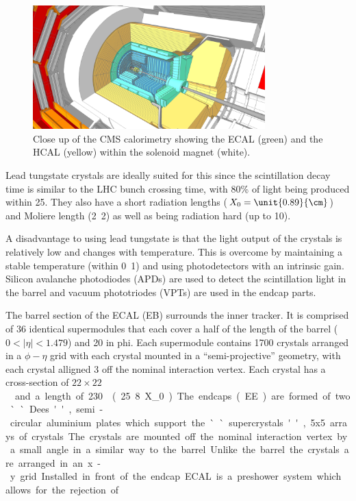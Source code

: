 \begin{figure}[htp]
  \centering
  \includegraphics[width=0.8\textwidth]{hcal.png}
  \caption{Close up of the CMS calorimetry showing the ECAL (green) and the HCAL
(yellow) within the solenoid magnet (white).}
  \label{fig:calo}
\end{figure}

Lead tungstate crystals are ideally suited for this since the scintillation
decay time is similar to the LHC bunch crossing time, 
with \unit{80}{\%} of light being produced within \unit{25}{\ns}.
They also have a short radiation lengths ($X_0=\unit{0.89}{\cm}$) 
and Moliere length (\unit{2.2}{\cm}) as well as being radiation hard
(up to \unit{10}{\mrad}).

A disadvantage to using lead tungstate is that the light output of the crystals
is relatively low and changes with temperature. This is overcome by maintaining
a stable temperature (within \unit{0.1}{\degreecelsius}) and using
photodetectors with an intrinsic gain.
Silicon avalanche photodiodes (APDs) are used to detect the scintillation light
in the barrel and vacuum phototriodes (VPTs) are used in the endcap parts.

The barrel section of the ECAL (EB) surrounds the inner tracker. It is comprised
of 36 identical supermodules that each cover a half of the length of the barrel
($0<|\eta|<1.479$) and \unit{20}{\degree} in phi. Each supermodule contains
1700 crystals arranged in a $\phi - \eta$ grid with each crystal mounted in a
``semi-projective'' geometry, with each crystal alligned \unit{3}{\degree} off the
nominal interaction vertex. Each crystal has a cross-section of
\unit{$22 \times 22$}{\mm\squared} and a length of
\unit{230}{\mm} (\unit{25.8}{X_0}).

The endcaps (EE) are formed of two ``Dees'', semi-circular aluminium plates
which support the ``supercrystals'', 5x5 arrays of crystals. The crystals are
mounted off the nominal interaction vertex by a small angle in a similar way
to the barrel. 
Unlike the barrel the crystals are arranged in an x-y grid.
Installed in front of the endcap ECAL is a preshower system which allows for
the rejection of \Ppizero .\cite{cms}

